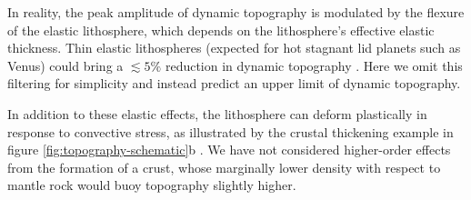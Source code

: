 \documentclass[trackchanges]{aastex63}
\newcommand{\todo}[1]{\textit{\textcolor{violet}{{#1}}}}
\begin{document}
In reality, the peak amplitude of dynamic topography is modulated by the flexure of the elastic lithosphere, which depends on the lithosphere's effective elastic thickness. Thin elastic lithospheres (expected for hot stagnant lid planets such as Venus) could bring a $\lesssim 5\%$ reduction in dynamic topography \citep{golle_topography_2012, dumoulin_predicting_2013, patocka_elasticity_2019}. Here we omit this filtering for simplicity and instead predict an upper limit of dynamic topography.

In addition to these elastic effects, %
the lithosphere can deform plastically in response to convective stress, as illustrated by the crustal thickening example in figure \ref{fig:topography-schematic}b \citep{kiefer_mantle_1991,pysklywec_time-dependent_2003, zampa_evidence_2018}. We have not considered higher-order effects from the formation of a crust, whose marginally lower density with respect to mantle rock would buoy topography slightly higher.




\end{document}
